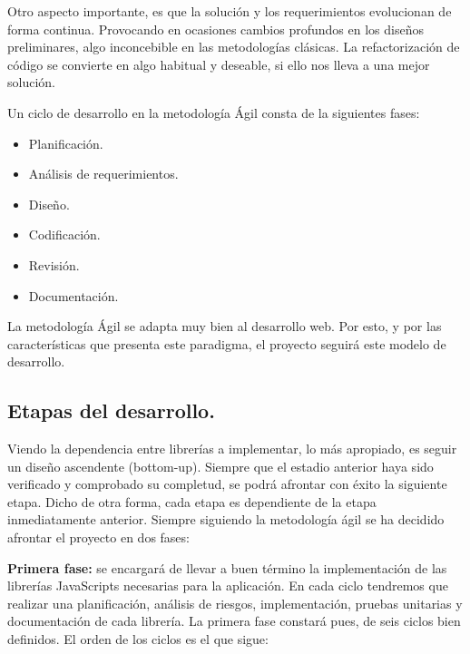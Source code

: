 Otro aspecto importante, es que la solución y los requerimientos evolucionan de forma continua. Provocando en ocasiones cambios profundos en los diseños preliminares, algo inconcebible en las metodologías clásicas. La refactorización de código se convierte en algo habitual y deseable, si ello nos lleva a una mejor solución.

Un ciclo de desarrollo en la metodología Ágil consta de la siguientes fases:

\begin{itemize}
\item Planificación.
\item Análisis de requerimientos.
\item Diseño.
\item Codificación.
\item Revisión.
\item Documentación.
\end{itemize}

La metodología Ágil se adapta muy bien al desarrollo web. Por esto, y por las características que presenta este paradigma, el proyecto seguirá este modelo de desarrollo.

\subsection{Etapas del desarrollo.}

Viendo la dependencia entre librerías a implementar, lo más apropiado, es seguir un diseño ascendente (bottom-up). Siempre que el estadio anterior haya sido verificado y comprobado su completud, se podrá afrontar con éxito la siguiente etapa. Dicho de otra forma, cada etapa es dependiente de la etapa inmediatamente anterior. Siempre siguiendo la metodología ágil se ha decidido afrontar el proyecto en dos fases:

\textbf{Primera fase:} se encargará de llevar a buen término la implementación de las librerías JavaScripts necesarias para la aplicación. En cada ciclo tendremos que realizar una planificación, análisis de riesgos, implementación, pruebas unitarias y documentación de cada librería. La primera fase constará pues, de seis ciclos bien definidos. El orden de los ciclos es el que sigue:

